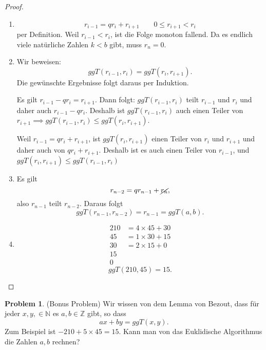 \documentclass[prb,12pt]{revtex4-2}
\theoremstyle{definition}
\newtheorem{Problem}{Problem}
\theoremstyle{definition}
\newenvironment{parts}{\begin{enumerate}[label=(\alph*)]}{\end{enumerate}}
\newcommand{\N}{\mathbb{N}}
\newcommand{\Z}{\mathbb{Z}}
\begin{document}
\begin{proof}
	\begin{parts}
	\item

		\[r_{i-1}=qr_{i}+r_{i+1}\qquad 0\le r_{i+1}<r_i\]
		per Definition. Weil $r_{i-1}<r_i$, ist die Folge monoton fallend. Da es endlich viele nat\"{u}rliche Zahlen $k<b$ gibt, muss $r_n=0$.
 

	\item Wir beweisen:
		\[
			ggT(r_{i-1}, r_i)=ggT(r_i,r_{i+1})
		.\]
		Die gewünschte Ergebnisse folgt daraus per Induktion.

		Es gilt $r_{i-1}-qr_i=r_{i+1}$. Dann folgt: $ggT(r_{i-1}, r_i)$ teilt $r_{i-1}$ und $r_i$ und daher auch $r_{i-1}-qr_i$. Deshalb ist $ggT(r_{i-1},r_i)$ auch einen Teiler von $r_{i+1}\implies ggT(r_{i-1},r_i)\le ggT(r_i, r_{i+1})$. 

		Weil $r_{i-1}=qr_i+r_{i+1}$, ist $ggT(r_i,r_{i+1})$ einen Teiler von $r_i$ und $r_{i+1}$ und daher auch von $qr_i+r_{i+1}$. Deshalb ist es auch einen Teiler von $r_{i-1}$, und $ggT(r_{i},r_{i+1})\le ggT(r_{i-1},r_i)$
	\item Es gilt
		\[
			r_{n-2}=qr_{n-1}+\cancel{r_{n}}
		,\] 
		also $r_{n-1}$ teilt $r_{n-2}$. Daraus folgt
		\[
			ggT(r_{n-1},r_{n-2})=r_{n-1}=ggT(a,b)
		.\] 
	\item 
		\begin{align*}
			210&=4 \times 45+30\\
			45&=1\times 30+15\\
			30&=2\times 15+0\\
			15&\\
			0&
		\end{align*}
		\[
		ggT(210,45)=15
		.\]

	\end{parts}
\end{proof}
\begin{Problem}
	(Bonus Problem) Wir wissen von dem Lemma von Bezout, dass f\"{u}r jeder $x,y,\in\N$ es $a,b\in \Z$ gibt, so dass
	\[
	ax+by=ggT(x,y)
	.\] 
	Zum Beispiel ist $-210+5\times 45=15$. Kann man von das Euklidische Algorithmus die Zahlen $a,b$ rechnen?
\end{Problem}
\end{document}
